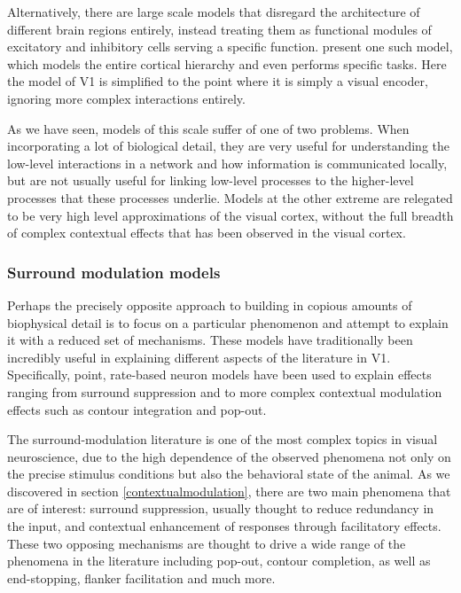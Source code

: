 Alternatively, there are large scale models that disregard the
architecture of different brain regions entirely, instead treating
them as functional modules of excitatory and inhibitory cells serving
a specific function. \cite{Eliasmith2012} present one such model,
which models the entire cortical hierarchy and even performs specific
tasks. Here the model of V1 is simplified to the point where it is
simply a visual encoder, ignoring more complex interactions entirely.

As we have seen, models of this scale suffer of one of two
problems. When incorporating a lot of biological detail, they are very
useful for understanding the low-level interactions in a network and
how information is communicated locally, but are not usually useful
for linking low-level processes to the higher-level processes that
these processes underlie. Models at the other extreme are relegated to
be very high level approximations of the visual cortex, without the
full breadth of complex contextual effects that has been observed in
the visual cortex.

\subsubsection{Surround modulation models} \label{SRmodels}

Perhaps the precisely opposite approach to building in copious amounts
of biophysical detail is to focus on a particular phenomenon and
attempt to explain it with a reduced set of mechanisms. These models
have traditionally been incredibly useful in explaining different
aspects of the literature in V1. Specifically, point, rate-based
neuron models have been used to explain effects ranging from surround
suppression and to more complex contextual modulation effects such as
contour integration and pop-out.

The surround-modulation literature is one of the most complex topics
in visual neuroscience, due to the high dependence of the observed
phenomena not only on the precise stimulus conditions but also the
behavioral state of the animal. As we discovered in section
\ref{contextualmodulation}, there are two main phenomena that are of
interest: surround suppression, usually thought to reduce redundancy
in the input, and contextual enhancement of responses through
facilitatory effects. These two opposing mechanisms are thought to
drive a wide range of the phenomena in the literature including
pop-out, contour completion, as well as end-stopping, flanker
facilitation and much more.

